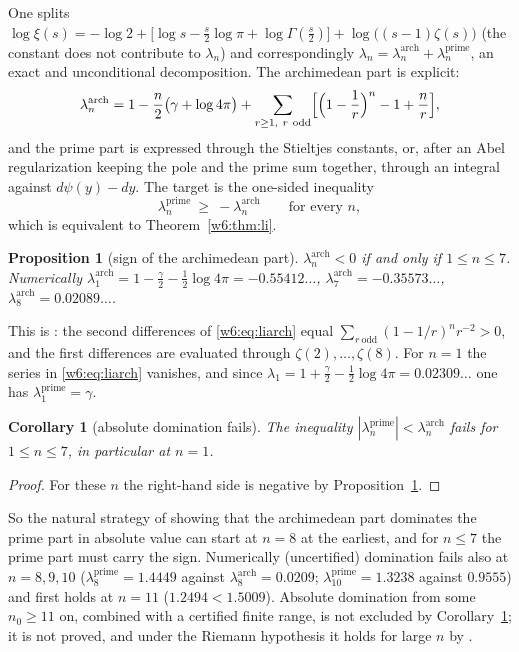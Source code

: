 \documentclass[11pt]{amsart}
\newtheorem{proposition}[theorem]{Proposition}
\newtheorem{corollary}[theorem]{Corollary}
\theoremstyle{definition}
\theoremstyle{remark}
\numberwithin{equation}{section}
\begin{document}
One splits $\log\xi(s)=-\log2+\bigl[\log s-\frac s2\log\pi+\log\Gamma(\frac s2)\bigr]+\log\bigl((s-1)\zeta(s)\bigr)$
(the constant does not contribute to $\lambda_n$) and correspondingly
$\lambda_n=\lambda_n^{\mathrm{arch}}+\lambda_n^{\mathrm{prime}}$, an exact and unconditional
decomposition. The archimedean part is explicit:
\begin{equation}\label{w6:eq:liarch}
\lambda_n^{\mathrm{arch}}=1-\frac n2\bigl(\gamma+\log4\pi\bigr)
+\sum_{r\ge1,\ r\ \mathrm{odd}}\Bigl[\Bigl(1-\frac1r\Bigr)^{n}-1+\frac nr\Bigr],
\end{equation}
and the prime part is expressed through the Stieltjes constants, or, after an Abel regularization
keeping the pole and the prime sum together, through an integral against $d\psi(y)-dy$. The
target is the one-sided inequality
\begin{equation}\label{w6:eq:lionesided}
\lambda_n^{\mathrm{prime}}\ \ge\ -\lambda_n^{\mathrm{arch}}\qquad\text{for every }n,
\end{equation}
which is equivalent to Theorem~\ref{w6:thm:li}.

\begin{proposition}[sign of the archimedean part]\label{w6:prop:liarch}
$\lambda_n^{\mathrm{arch}}<0$ if and only if $1\le n\le7$. Numerically
$\lambda_1^{\mathrm{arch}}=1-\frac\gamma2-\frac12\log4\pi=-0.55412\ldots$,
$\lambda_7^{\mathrm{arch}}=-0.35573\ldots$, $\lambda_8^{\mathrm{arch}}=0.02089\ldots$.
\end{proposition}

This is \cite[Lemma~9.121]{P36}: the second differences of \eqref{w6:eq:liarch} equal
$\sum_{r\ \mathrm{odd}}(1-1/r)^n r^{-2}>0$, and the first differences are evaluated through
$\zeta(2),\dots,\zeta(8)$. For $n=1$ the series in \eqref{w6:eq:liarch} vanishes, and since
$\lambda_1=1+\frac\gamma2-\frac12\log4\pi=0.02309\ldots$ one has $\lambda_1^{\mathrm{prime}}=\gamma$.

\begin{corollary}[absolute domination fails]\label{w6:cor:absdom}
The inequality $|\lambda_n^{\mathrm{prime}}|<\lambda_n^{\mathrm{arch}}$ fails for $1\le n\le7$, in
particular at $n=1$.
\end{corollary}
\begin{proof}
For these $n$ the right-hand side is negative by Proposition~\ref{w6:prop:liarch}.
\end{proof}

So the natural strategy of showing that the archimedean part dominates the prime part in absolute
value can start at $n=8$ at the earliest, and for $n\le7$ the prime part must carry the sign.
Numerically (uncertified) domination fails also at $n=8,9,10$
($\lambda_8^{\mathrm{prime}}=1.4449$ against $\lambda_8^{\mathrm{arch}}=0.0209$;
$\lambda_{10}^{\mathrm{prime}}=1.3238$ against $0.9555$) and first holds at $n=11$
($1.2494<1.5009$). Absolute domination from some $n_0\ge11$ on, combined with a certified finite
range, is not excluded by Corollary~\ref{w6:cor:absdom}; it is not proved, and under the Riemann
hypothesis it holds for large $n$ by \cite{BombieriLagarias1999}.
\end{document}
